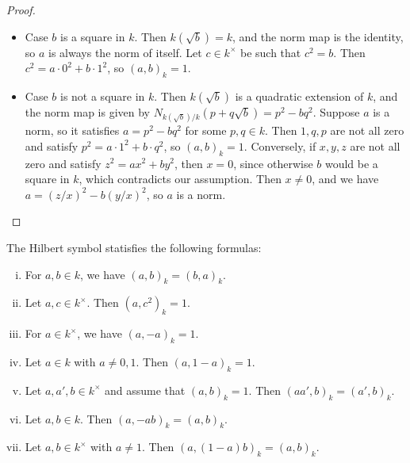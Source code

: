 \begin{proof}
	\begin{itemize}
		\item Case $b$ is a square in $k$. Then $k(\sqrt{b}) = k$, and the norm map is the identity, so
		$a$ is always the norm of itself. Let $c \in k^\times$ be such that $c^2 = b$.
		Then $c^2 = a \cdot 0^2 + b \cdot 1^2$, so $(a,b)_k=1$.
		\item Case $b$ is not a square in $k$. Then $k(\sqrt{b})$ is a quadratic extension of $k$, and
		the norm map is given by $N_{k(\sqrt{b})/k}(p + q \sqrt{b}) = p^2 - b q^2$.
		Suppose $a$ is a norm, so it satisfies $a = p^2 - b q^2$ for some $p, q \in k$.
		Then $1, q, p$ are not all zero and satisfy $ p^2 = a \cdot 1^2 + b \cdot q^2$,
		so $(a, b)_k = 1$. Conversely, if $x, y, z$ are not all zero and satisfy $z^2 = ax^2 + by^2$,
		then $x=0$, since otherwise $b$ would be a square in $k$, which contradicts our assumption.
		Then $x \ne 0$, and we have $a = (z/x)^2 - b (y/x)^2$, so $a$ is a norm.
	\end{itemize}
\end{proof}

\begin{proposition}
	\label{prop:hilbert_symbol_properties}
	\leanok
	The Hilbert symbol statisfies the following formulas:
	\begin{enumerate}[(i)]
		\item For $a, b \in k$, we have $(a, b)_k = (b, a)_k$.
		\item Let $a, c \in k^\times$. Then $(a, c^2)_k = 1$.
		\item For $a \in k^\times$, we have $(a, -a)_k = 1$.
		\item Let $a \in k$ with $a \ne 0, 1$. Then $(a, 1 - a)_k = 1$.
		\item Let $a, a', b \in k^\times$ and assume that $(a, b)_k = 1$. Then $(a a', b)_k = (a', b)_k$.
		\item Let $a, b \in k$. Then $(a, -ab)_k = (a, b)_k$.
		\item Let $a, b \in k^\times$ with $a \ne 1$. Then $(a, (1-a)b)_k = (a, b)_k$.
	\end{enumerate}
\end{proposition}

